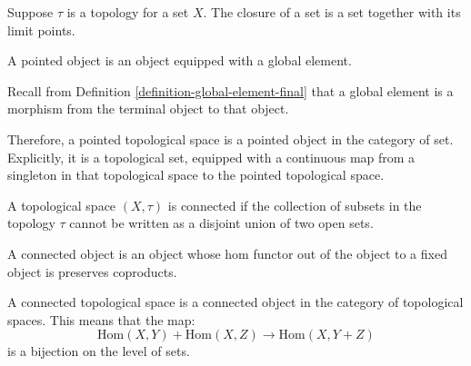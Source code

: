 \begin{definition}
	\label{definition-closure}
	Suppose $\tau$ is a topology for a set $X$.
	The closure of a set is a set together with its limit points.
\end{definition}

\begin{definition}
    \label{definition-pointed-topological-space}
    A pointed object is an object equipped with a global element.

    Recall from Definition \ref{definition-global-element-final} that a global element is a morphism from the terminal object to that object.

    Therefore, a pointed topological space is a pointed object in the category of set. Explicitly, it is a topological set, equipped with a continuous map from a singleton in that topological space to the pointed topological space.
\end{definition}

\begin{definition}
    \label{definition-connected-topological-space-disjoint}
    A topological space $(X, \tau)$
	is connected if the collection of subsets in the topology $\tau$ cannot be written as a disjoint union of two open sets.
\end{definition}

\begin{definition}
    \label{definition-connected-topological-space-internal}
    A connected object is an object whose hom functor out of the object to a fixed object is preserves coproducts.

	A connected topological space is a connected object in the category of topological spaces.
	This means that the map:
	\begin{equation}
		\mathrm{Hom}(X,Y) + \mathrm{Hom}(X,Z)
		\rightarrow \mathrm{Hom}(X,Y+Z)
	\end{equation}
	is a bijection on the level of sets.
\end{definition}